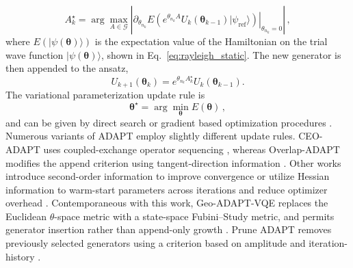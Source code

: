 \documentclass[
  reprint,
  amsmath,
  amssymb,
  aps,
  pra,
  nofootinbib,
  superscriptaddress,
  floatfix
]{revtex4-2}
\newcommand{\ket}[1]{|#1\rangle}
\begin{document}
\begin{equation}
A_k^\star=\arg\max_{A\in\mathcal G}
\left|
\left.
\partial_{\theta_{n_k}}E\!\left(e^{\theta_{n_k} A}U_k(\boldsymbol{\theta}_{k-1})\ket{\psi_{\mathrm{ref}}}\right)
\right|_{\theta_{n_k}=0}
\right|\,,
\label{eq:adapt_append_gradient}
\end{equation}
where $E(\ket{\psi(\boldsymbol{\theta})})$ is the expectation value of the Hamiltonian on the trial wave function $\ket{\psi(\boldsymbol{\theta})}$, shown in Eq.~\eqref{eq:rayleigh_static}. The new generator is then appended to the ansatz,
\begin{equation}
U_{k+1}(\boldsymbol{\theta}_{k})=e^{\theta_{n_k} A_k^\star}U_k(\boldsymbol{\theta}_{k-1}).
\label{eq:adapt_append_update}
\end{equation}
The variational parameterization update rule is
\begin{equation}
\label{eq:theta_opt}
\boldsymbol{\theta}^\star=\arg\min_{\boldsymbol{\theta}}E(\boldsymbol{\theta})\,,
\end{equation}
%
and can be given by direct search or gradient based optimization procedures \cite{BonetMonroig2023Optimizer,Singh2023Optimizers,Gacon2021QNSPSA}. Numerous variants of ADAPT employ slightly different update rules. CEO-ADAPT uses coupled-exchange operator sequencing \cite{Ramoa2025}, whereas Overlap-ADAPT modifies the append criterion using tangent-direction information \cite{Feniou2023}. Other works introduce second-order information to improve convergence \cite{Grimsley2023ADAPT} or utilize Hessian information to warm-start parameters across iterations and reduce optimizer overhead \cite{Ramoa2025HessianRecycling}.
Contemporaneous with this work, Geo-ADAPT-VQE replaces the Euclidean \(\theta\)-space metric with a state-space Fubini--Study metric, and permits generator insertion rather than append-only growth \cite{Sohail2026GeoADAPT}. Prune ADAPT removes previously selected generators using a criterion based on amplitude and iteration-history \cite{Vaquero2025PrunedADAPT}.
\end{document}
